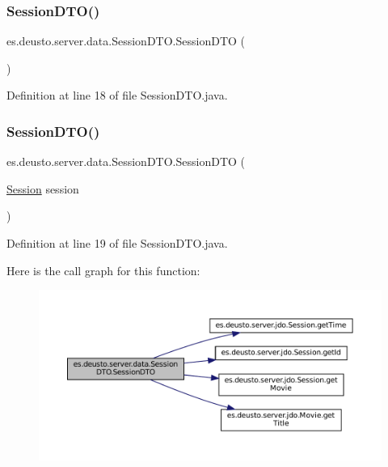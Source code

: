 \subsubsection{\texorpdfstring{SessionDTO()}{SessionDTO()}\hspace{0.1cm}{\footnotesize\ttfamily [1/2]}}
{\footnotesize\ttfamily es.\+deusto.\+server.\+data.\+Session\+D\+T\+O.\+Session\+D\+TO (\begin{DoxyParamCaption}{ }\end{DoxyParamCaption})}



Definition at line 18 of file Session\+D\+T\+O.\+java.

\mbox{\label{classes_1_1deusto_1_1server_1_1data_1_1_session_d_t_o_a8bdfa9095064ac9b72508b348302c852}} 
\subsubsection{\texorpdfstring{SessionDTO()}{SessionDTO()}\hspace{0.1cm}{\footnotesize\ttfamily [2/2]}}
{\footnotesize\ttfamily es.\+deusto.\+server.\+data.\+Session\+D\+T\+O.\+Session\+D\+TO (\begin{DoxyParamCaption}\item[{\mbox{\hyperlink{classes_1_1deusto_1_1server_1_1jdo_1_1_session}{Session}}}]{session }\end{DoxyParamCaption})}



Definition at line 19 of file Session\+D\+T\+O.\+java.

Here is the call graph for this function\+:
\nopagebreak
\begin{figure}[H]
\begin{center}
\leavevmode
\includegraphics[width=350pt]{classes_1_1deusto_1_1server_1_1data_1_1_session_d_t_o_a8bdfa9095064ac9b72508b348302c852_cgraph}
\end{center}
\end{figure}


